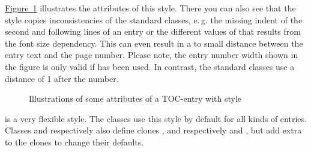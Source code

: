 \begin{description}
  \hyperref[fig:tocbasic.largetocline]%
  {Figure~\ref*{fig:tocbasic.largetocline}} illustrates the attributes of this
  style. There you can also see that the style copies inconsistencies of the
  standard classes, e.\,g. the missing indent of the second and following
  lines of an entry or the different values of  that results
  from the font size dependency. This can even result in a to small distance
  between the entry text and the page number. Please note, the entry number
  width shown in the figure is only valid if
   has been used. In contrast, the standard
  classes use a distance of 1 after the number.
  \begin{figure}
    \centering
    \caption{Illustrations of some attributes of a TOC-entry with style 
      }
    \label{fig:tocbasic.largetocline}
  \end{figure}
\item[\PValue{tocline}] is a very flexible style. The \KOMAScript{} classes
  use this style by default for all kinds of entries. Classes 
  and  respectively  also define
  clones ,  and  respectively
   and , but add extra
   to the clones to change their defaults.


\end{description}
